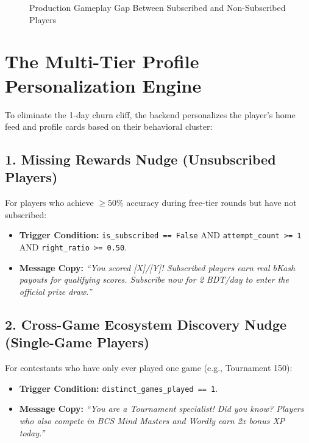 \begin{figure}[htbp]
\centering
{}
\caption{Production Gameplay Gap Between Subscribed and Non-Subscribed Players}
\end{figure}

\section{The Multi-Tier Profile Personalization Engine}
To eliminate the 1-day churn cliff, the backend personalizes the player's home feed and profile cards based on their behavioral cluster:

\subsection{1. Missing Rewards Nudge (Unsubscribed Players)}
For players who achieve $\ge 50\%$ accuracy during free-tier rounds but have not subscribed:
\begin{itemize}
    \item \textbf{Trigger Condition:} \texttt{is\_subscribed == False} AND \texttt{attempt\_count >= 1} AND \texttt{right\_ratio >= 0.50}.
    \item \textbf{Message Copy:} \textit{``You scored [X]/[Y]! Subscribed players earn real bKash payouts for qualifying scores. Subscribe now for 2 BDT/day to enter the official prize draw.''}
\end{itemize}

\subsection{2. Cross-Game Ecosystem Discovery Nudge (Single-Game Players)}
For contestants who have only ever played one game (e.g., Tournament 150):
\begin{itemize}
    \item \textbf{Trigger Condition:} \texttt{distinct\_games\_played == 1}.
    \item \textbf{Message Copy:} \textit{``You are a Tournament specialist! Did you know? Players who also compete in BCS Mind Masters and Wordly earn 2x bonus XP today.''}
\end{itemize}

